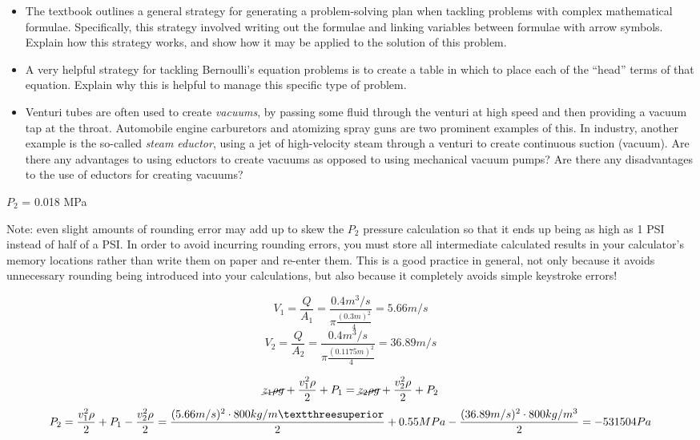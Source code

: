 \begin{itemize}
\item{} The textbook outlines a general strategy for generating a problem-solving plan when tackling problems with complex mathematical formulae.  Specifically, this strategy involved writing out the formulae and linking variables between formulae with arrow symbols.  Explain how this strategy works, and show how it may be applied to the solution of this problem.
\item{} A very helpful strategy for tackling Bernoulli's equation problems is to create a table in which to place each of the ``head'' terms of that equation.  Explain why this is helpful to manage this specific type of problem.
\item{} Venturi tubes are often used to create {\it vacuums}, by passing some fluid through the venturi at high speed and then providing a vacuum tap at the throat.  Automobile engine carburetors and atomizing spray guns are two prominent examples of this.  In industry, another example is the so-called {\it steam eductor}, using a jet of high-velocity steam through a venturi to create continuous suction (vacuum).  Are there any advantages to using eductors to create vacuums as opposed to using mechanical vacuum pumps?  Are there any disadvantages to the use of eductors for creating vacuums?
\end{itemize}







$P_2$ = 0.018 MPa 

\vskip 10pt

Note: even slight amounts of rounding error may add up to skew the $P_2$ pressure calculation so that it ends up being as high as 1 PSI instead of half of a PSI.  In order to avoid incurring rounding errors, you must store all intermediate calculated results in your calculator's memory locations rather than write them on paper and re-enter them.  This is a good practice in general, not only because it avoids unnecessary rounding being introduced into your calculations, but also because it completely avoids simple keystroke errors!







$$V_1=\frac{Q}{A_1}=\frac{0.4m^3/s}{\pi \frac{(0.3m)^2}{4}}=5.66m/s$$
$$V_2=\frac{Q}{A_2}=\frac{0.4m^3/s}{\pi \frac{(0.1175m)^2}{4}}=36.89m/s$$

$$\cancel{z_1 \rho g} + {v_1^2 \rho \over 2} + P_1 = \cancel{z_2 \rho g} + {v_2^2 \rho \over 2} + P_2$$
$$P_2={v_1^2 \rho \over 2} + P_1 - {v_2^2 \rho \over 2}=\frac{(5.66m/s)^2\cdot 800kg/m³}{2}+0.55MPa-\frac{(36.89m/s)^2\cdot 800kg/m^3}{2}=-531504Pa$$





